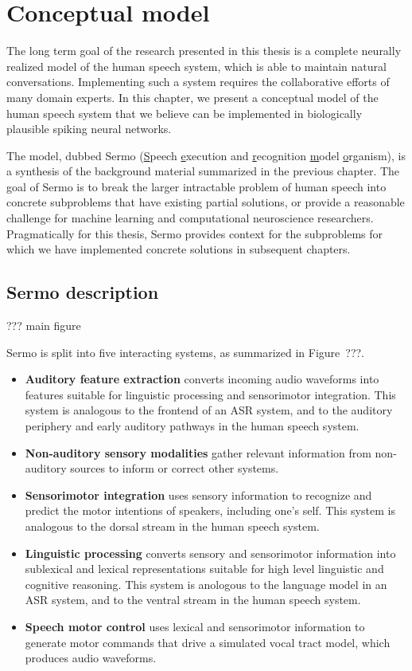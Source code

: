 \chapter{Conceptual model}

The long term goal of the research
presented in this thesis
is a complete neurally realized model
of the human speech system,
which is able to maintain
natural conversations.
Implementing such a system
requires the collaborative efforts
of many domain experts.
In this chapter, we present
a conceptual model of the human speech system
that we believe can be implemented
in biologically plausible spiking neural networks.

The model, dubbed Sermo
(\underline{S}peech \underline{e}xecution and \underline{r}ecognition
\underline{m}odel \underline{o}rganism),
is a synthesis of the background material
summarized in the previous chapter.
The goal of Sermo
is to break the larger
intractable problem of human speech
into concrete subproblems
that have existing partial solutions,
or provide a reasonable challenge
for machine learning
and computational neuroscience researchers.
Pragmatically for this thesis,
Sermo provides context for
the subproblems for which
we have implemented concrete solutions
in subsequent chapters.

\section{Sermo description}

??? main figure

Sermo is split into five interacting systems,
as summarized in Figure~???.
\begin{itemize}
  \item \textbf{Auditory feature extraction}
    converts incoming audio waveforms into
    features suitable for linguistic processing
    and sensorimotor integration.
    This system is analogous to the frontend
    of an ASR system,
    and to the auditory periphery and
    early auditory pathways in the human speech system.
  \item \textbf{Non-auditory sensory modalities}
    gather relevant information
    from non-auditory sources
    to inform or correct other systems.
  \item \textbf{Sensorimotor integration}
    uses sensory information to
    recognize and predict the motor intentions
    of speakers, including one's self.
    This system is analogous to the
    dorsal stream in the human speech system.
  \item \textbf{Linguistic processing}
    converts sensory and sensorimotor information
    into sublexical and lexical representations
    suitable for high level linguistic
    and cognitive reasoning.
    This system is anologous to
    the language model in an ASR system,
    and to the ventral stream
    in the human speech system.
  \item \textbf{Speech motor control}
    uses lexical and sensorimotor information
    to generate motor commands
    that drive a simulated vocal tract model,
    which produces audio waveforms.
\end{itemize}

